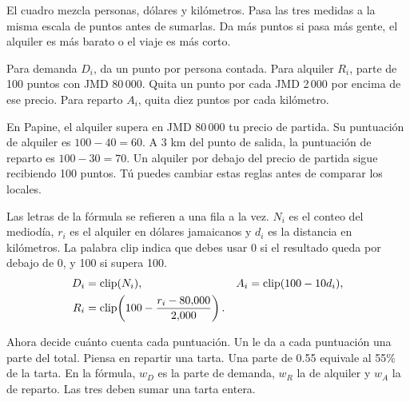 {El cuadro mezcla personas, dólares y kilómetros. Pasa las tres medidas a la misma escala de puntos antes de sumarlas. Da más puntos si pasa más gente, el alquiler es más barato o el viaje es más corto.}
{Para demanda \(D_i\), da un punto por persona contada. Para alquiler \(R_i\), parte de 100 puntos con JMD 80\,000. Quita un punto por cada JMD 2\,000 por encima de ese precio. Para reparto \(A_i\), quita diez puntos por cada kilómetro.

En Papine, el alquiler supera en JMD 80\,000 tu precio de partida. Su puntuación de alquiler es \(100-40=60\). A 3 km del punto de salida, la puntuación de reparto es \(100-30=70\). Un alquiler por debajo del precio de partida sigue recibiendo 100 puntos. Tú puedes cambiar estas reglas antes de comparar los locales.}

{Las letras de la fórmula se refieren a una fila a la vez. \(N_i\) es el conteo del mediodía, \(r_i\) es el alquiler en dólares jamaicanos y \(d_i\) es la distancia en kilómetros. La palabra \(\mathrm{clip}\) indica que debes usar 0 si el resultado queda por debajo de 0, y 100 si supera 100.}
\begin{align}
 D_i&=\mathrm{clip}(N_i), & A_i&=\mathrm{clip}(100-10d_i),\notag\\
 R_i&=\mathrm{clip}\!\left(100-\frac{r_i-80{,}000}{2{,}000}\right).
 \label{eq:patty-scores}
\end{align}

{Ahora decide cuánto cuenta cada puntuación. Un  le da a cada puntuación una parte del total. Piensa en repartir una tarta. Una parte de 0.55 equivale al 55\% de la tarta. En la fórmula, \(w_D\) es la parte de demanda, \(w_R\) la de alquiler y \(w_A\) la de reparto. Las tres deben sumar una tarta entera.}

